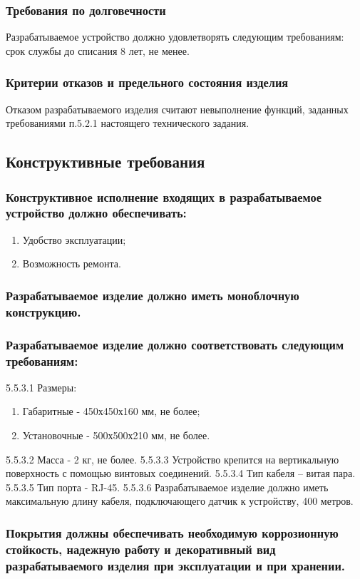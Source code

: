 			\subsubsection{Требования по долговечности}
				Разрабатываемое устройство должно удовлетворять следующим требованиям: срок службы до списания 8 лет, не менее.
			\subsubsection{Критерии отказов и предельного состояния изделия}
				Отказом разрабатываемого изделия считают невыполнение функций, заданных требованиями п.5.2.1 настоящего технического задания.
		\subsection{Конструктивные требования}
			\subsubsection{Конструктивное исполнение входящих в разрабатываемое устройство должно обеспечивать:}
				\begin{enumerate}
					\item Удобство эксплуатации;
					\item Возможность ремонта.
				\end{enumerate}
				\subsubsection{Разрабатываемое изделие должно иметь моноблочную конструкцию.}
				\subsubsection{Разрабатываемое изделие должно соответствовать следующим требованиям:}
					5.5.3.1 Размеры:
					\begin{enumerate}
						\item Габаритные - 450х450х160 мм, не более;
						\item Установочные - 500х500х210 мм, не более.
					\end{enumerate}
					5.5.3.2 Масса - 2 кг, не более.
					5.5.3.3 Устройство крепится на вертикальную поверхность с помощью винтовых соединений.
					5.5.3.4 Тип кабеля – витая пара.
					5.5.3.5 Тип порта - RJ-45.
					5.5.3.6 Разрабатываемое изделие должно иметь максимальную длину кабеля, подключающего датчик к устройству, 400 метров.
					\subsubsection{Покрытия должны обеспечивать необходимую коррозионную стойкость, надежную работу и декоративный вид разрабатываемого изделия при эксплуатации и при хранении.}
